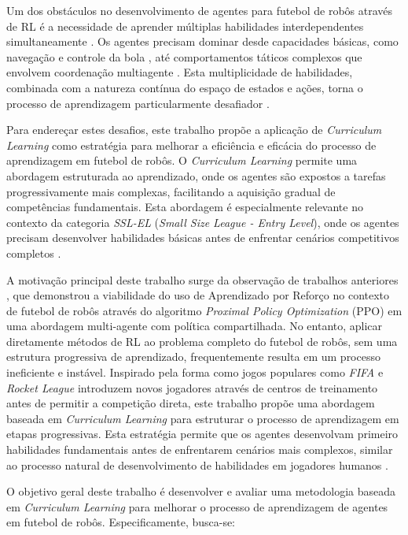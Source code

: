 Um dos obstáculos no desenvolvimento de agentes para futebol de robôs através de RL é a necessidade de aprender múltiplas habilidades interdependentes simultaneamente \cite{ssl_skills}. Os agentes precisam dominar desde capacidades básicas, como navegação e controle da bola \cite{soccer_skills_bipedal_robot}, até comportamentos táticos complexos que envolvem coordenação multiagente \cite{bruno_brandao}. Esta multiplicidade de habilidades, combinada com a natureza contínua do espaço de estados e ações, torna o processo de aprendizagem particularmente desafiador \cite{soccer_skills_bipedal_robot}.

Para endereçar estes desafios, este trabalho propõe a aplicação de \textit{Curriculum Learning} \cite{curriculum} como estratégia para melhorar a eficiência e eficácia do processo de aprendizagem em futebol de robôs. O \textit{Curriculum Learning} permite uma abordagem estruturada ao aprendizado, onde os agentes são expostos a tarefas progressivamente mais complexas, facilitando a aquisição gradual de competências fundamentais. Esta abordagem é especialmente relevante no contexto da categoria \textit{SSL-EL} (\textit{Small Size League - Entry Level}), onde os agentes precisam desenvolver habilidades básicas antes de enfrentar cenários competitivos completos \cite{regras_ssl_el_2024}.

A motivação principal deste trabalho surge da observação de trabalhos anteriores \cite{bruno_brandao}, que demonstrou a viabilidade do uso de Aprendizado por Reforço no contexto de futebol de robôs através do algoritmo \textit{Proximal Policy Optimization} (PPO) em uma abordagem multi-agente com política compartilhada. No entanto, aplicar diretamente métodos de RL ao problema completo do futebol de robôs, sem uma estrutura progressiva de aprendizado, frequentemente resulta em um processo ineficiente e instável. Inspirado pela forma como jogos populares como \textit{FIFA} e \textit{Rocket League} introduzem novos jogadores através de centros de treinamento antes de permitir a competição direta, este trabalho propõe uma abordagem baseada em \textit{Curriculum Learning} para estruturar o processo de aprendizagem em etapas progressivas. Esta estratégia permite que os agentes desenvolvam primeiro habilidades fundamentais antes de enfrentarem cenários mais complexos, similar ao processo natural de desenvolvimento de habilidades em jogadores humanos \cite{relay_long_horizon}.

O objetivo geral deste trabalho é desenvolver e avaliar uma metodologia baseada em \textit{Curriculum Learning} para melhorar o processo de aprendizagem de agentes em futebol de robôs. Especificamente, busca-se:

